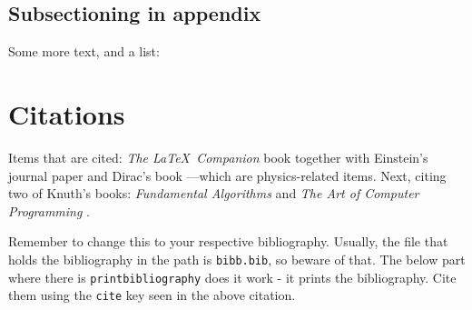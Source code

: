 \documentclass[10pt,a4paper]{article}
\begin{document}
\subsection*{Subsectioning in appendix}

Some more text, and a list:

\blindenumerate



\section{Citations}
Items that are cited: \textit{The \LaTeX\ Companion} book \cite{latexcompanion} together with Einstein's journal paper \cite{einstein} and Dirac's book \cite{dirac}---which are physics-related items. Next, citing two of Knuth's books: \textit{Fundamental Algorithms} \cite{knuth-fa} and \textit{The Art of Computer Programming} \cite{knuthwebsite}.


Remember to change this to your respective bibliography. Usually, the file that holds the bibliography in the path is \texttt{bibb.bib}, so beware of that. The below part where there is \texttt{printbibliography} does it work - it prints the bibliography. Cite them using the \texttt{cite} key seen in the above citation. 

\medskip

\printbibliography %
\end{document}
